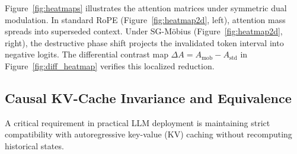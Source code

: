 \documentclass[11pt,a4paper]{article}
\theoremstyle{definition}
\begin{document}
Figure~\ref{fig:heatmaps} illustrates the attention matrices under symmetric dual modulation. In standard RoPE (Figure~\ref{fig:heatmap2d}, left), attention mass spreads into superseded context. Under SG-M\"obius (Figure~\ref{fig:heatmap2d}, right), the destructive phase shift projects the invalidated token interval into negative logits. The differential contrast map $\Delta A = A_{\mathrm{mob}} - A_{\mathrm{std}}$ in Figure~\ref{fig:diff_heatmap} verifies this localized reduction.

\subsection{Causal KV-Cache Invariance and Equivalence}
A critical requirement in practical LLM deployment is maintaining strict compatibility with autoregressive key-value (KV) caching without recomputing historical states.
\end{document}
